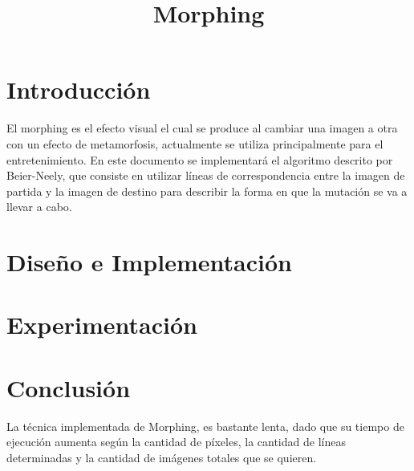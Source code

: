 \documentclass[conference]{IEEEtran}
\begin{document}
\title{Morphing}
\author{
}


\maketitle

\begin{abstract}
	
\end{abstract}
 

\section*{Introducción} %
	El morphing es el efecto visual el cual se produce al cambiar una imagen a otra con un efecto de metamorfosis, actualmente se utiliza principalmente para el entretenimiento. En este documento se implementará el algoritmo descrito por Beier-Neely, que consiste en utilizar líneas de correspondencia entre la imagen de partida y la imagen de destino para describir la forma en que la mutación se va a llevar a cabo.

\section*{Diseño e Implementación}
	
\section*{Experimentación}
	
\section*{Conclusión}
	La técnica implementada de Morphing, es bastante lenta, dado que su tiempo de ejecución aumenta según la cantidad de píxeles, la cantidad de líneas determinadas y la cantidad de imágenes totales que se quieren.
	
\begin{thebibliography}{99}

\end{thebibliography}
\end{document}

